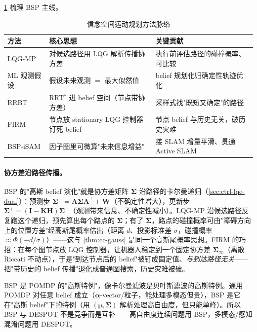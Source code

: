 \cref{tab:bsp} 梳理 BSP 主线。

\begin{table}[H]\centering\small
\caption{信念空间运动规划方法脉络}
\label{tab:bsp}
\begin{tabular}{lll}
\toprule
方法 & 核心思想 & 关键贡献 \\
\midrule
LQG-MP\cite{vandenberg2011lqgmp} & 对候选路径用 LQG 解析传播协方差 & 执行前评估路径的碰撞概率、可比较 \\
ML 观测假设\cite{platt2010belief} & 假设未来观测 $=$ 最大似然值 & belief 规划化归确定性轨迹优化 \\
RRBT\cite{bry2011rrbt} & RRT$^*$ 进 belief 空间（节点带协方差）& 采样式找"既短又确定"的路径 \\
FIRM\cite{aghamohammadi2014firm} & 节点放 stationary LQG 控制器钉死 belief & 节点 belief 与历史无关，破历史灾难 \\
BSP-iSAM\cite{indelman2015bsp} & 因子图里可微算"未来信息增益" & 接 SLAM 增量平滑、贯通 Active SLAM \\
\bottomrule
\end{tabular}
\end{table}

\paragraph{协方差沿路径传播。}
BSP 的"高斯 belief 演化"就是协方差矩阵 $\boldsymbol{\Sigma}$ 沿路径的卡尔曼递归（\cref{sec:ctrl-lqe-dual}）：预测步 $\boldsymbol{\Sigma}^-=\mathbf{A}\boldsymbol{\Sigma}\mathbf{A}^\top+\mathbf{W}$（不确定性增大），更新步 $\boldsymbol{\Sigma}^+=(\mathbf{I}-\mathbf{K}\mathbf{H})\boldsymbol{\Sigma}^-$（观测带来信息、不确定性减小）。LQG-MP 沿候选路径反复跑这个递归，预先算出每个路点的 $\boldsymbol{\Sigma}$；有了 $\boldsymbol{\Sigma}$，路点的碰撞概率可由"障碍方向上的位置方差"经高斯尾概率估出（距离 $d$、投影标准差 $\sigma$，碰撞概率 $\approx\Phi(-d/\sigma)$）——这与 \cref{thm:cc-gauss} 是同一个高斯尾概率思想。FIRM 的巧招：在每个图节点放 LQG 控制器，让机器人稳定到一个固定协方差 $\boldsymbol{\Sigma}_\infty$（离散 Riccati 不动点），于是"到达节点后的 belief"被钉成固定值、\emph{与到达路径无关}——把"带历史的 belief 传播"退化成普通图搜索，历史灾难被破。

\begin{insight}
BSP 是 POMDP 的"高斯特例"，像卡尔曼滤波是贝叶斯滤波的高斯特例。通用 POMDP 对任意 belief 成立（$\boldsymbol{\alpha}$-vector/粒子，能处理多模态但贵），BSP 是它在"高斯 belief"下的特例（用 $(\boldsymbol{\mu},\boldsymbol{\Sigma})$ 解析处理高自由度，但只能单峰）。所以 BSP 与 DESPOT 不是竞争而是互补——高自由度连续问题用 BSP，多模态/感知混淆问题用 DESPOT。
\end{insight}

